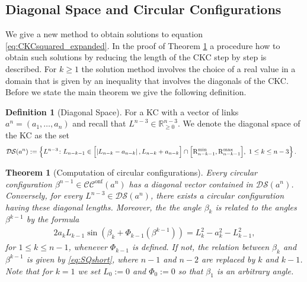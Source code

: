 \documentclass[10pt,a4paper]{article}
\newtheorem{theorem}{Theorem}[section]
\theoremstyle{definition}
\newtheorem{definition}{Definition}[section]
\theoremstyle{remark}
\numberwithin{equation}{section}
\newcommand{\Cc}{\mathcal{CC}^{\mathrm{onf}}}
\begin{document}
\subsection{Diagonal Space and Circular Configurations}\label{sec:CC} 

We give a new method to obtain solutions to equation \eqref{eq:CKCsquared_expanded}. In the proof of Theorem \ref{thm:sampling} a procedure how to obtain such solutions by reducing the length of the CKC step by step is described. For $k \geq 1$ the solution method involves the choice of a real value in a domain that is given by an inequality that involves the diagonals of the CKC. Before we state the main theorem we give the following definition.      

\begin{definition}[Diagonal Space]\label{def:DiagSpace} For a KC with a vector of links  $a^n= ( a_1,\dots, a_n) $ and recall that $L^{n-3} \in \mathbb{R}^{n-3}_{\geq 0}$. We denote the diagonal space of the KC as the set \begin{align}
&\mathcal{DS}({a^n}):= \left\{  L^{n-3}  \colon L_{n-k-1} \in   
\Bigl[\left|L_{n-k}-a_{n-k}\right|,L_{n-k}+a_{n-k}\Bigr] \cap  
\Bigl[\mathrm{R}_{n-k-1}^{\min}, \mathrm{    R}_{n-k-1}^{\max}\Bigr], ~1\leq k \leq n-3 \right\}.   
\end{align}
\end{definition}


\begin{theorem}[Computation of circular configurations]\label{thm:sampling} Every circular configuration
\(\beta^{n-1}\in  \Cc(a^n)\)
has a diagonal vector contained in
\(\mathcal{DS}(a^n)\).
Conversely, for every
\(L^{n-3}\in\mathcal{DS}(a^n)\),
there exists a circular configuration having these diagonal lengths. Moreover, the the angle $\beta_k$ is related to the angles $\beta^{k-1}$ by the formula 
\begin{align}\label{eq:diagangle}
2 a_k L_{k-1}  \sin\left( \beta_k + \Phi_{k-1}\left( \beta^{k-1}\right)  \right) =  L_k^2  - a_k^2 - L_{k-1}^2,   
\end{align}
for $1 \leq k \leq n-1$, whenever $\Phi_{k-1}$ is defined. If not, the relation between $\beta_k$ and $\beta^{k-1}$ is given by \eqref{eq:SQshort}, where $n-1$ and $n-2$ are replaced by $k$ and $k-1$. Note that for $k=1$ we set $L_0 := 0$ and $\Phi_0 :=0$ so that $\beta_1$ is an arbitrary angle. 
\end{theorem}
\end{document}
